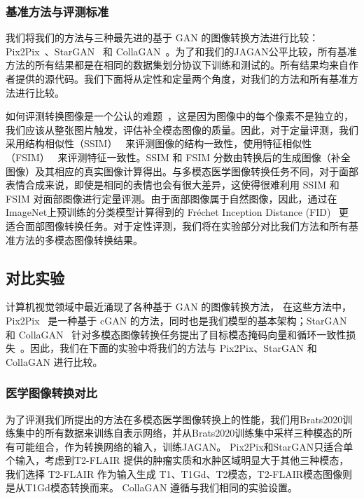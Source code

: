 \subsubsection{基准方法与评测标准}

我们将我们的方法与三种最先进的基于 GAN 的图像转换方法进行比较：Pix2Pix~\cite{pix2pix}、StarGAN~\cite{stargan} 和 CollaGAN~\cite{collagan}。为了和我们的JAGAN公平比较，所有基准方法的所有结果都是在相同的数据集划分协议下训练和测试的。所有结果均来自作者提供的源代码。我们下面将从定性和定量两个角度，对我们的方法和所有基准方法进行比较。

如何评测转换图像是一个公认的难题~\cite{salimans2016improved}，这是因为图像中的每个像素不是独立的，我们应该从整张图片触发，评估补全模态图像的质量。因此，对于定量评测，我们采用结构相似性（SSIM）~\cite{ssim} 来评测图像的结构一致性，使用特征相似性（FSIM）~\cite{fsim} 来评测特征一致性。SSIM 和 FSIM 分数由转换后的生成图像（补全图像）及其相应的真实图像计算得出。与多模态医学图像转换任务不同，对于面部表情合成来说，即使是相同的表情也会有很大差异，这使得很难利用 SSIM 和 FSIM 对面部图像进行定量评测。由于面部图像属于自然图像，因此，通过在ImageNet上预训练的分类模型计算得到的 Fréchet Inception Distance (FID)~\cite{fid} 更适合面部图像转换任务。对于定性评测，我们将在实验部分对比我们方法和所有基准方法的多模态图像转换结果。

\subsection{对比实验}

计算机视觉领域中最近涌现了各种基于 GAN 的图像转换方法， 在这些方法中，Pix2Pix~\cite{pix2pix} 是一种基于 cGAN 的方法，同时也是我们模型的基本架构；StarGAN~\cite{stargan} 和 CollaGAN~\cite{collagan} 针对多模态图像转换任务提出了目标模态掩码向量和循环一致性损失~\cite{cyclegan}。因此，我们在下面的实验中将我们的方法与 Pix2Pix、StarGAN 和 CollaGAN 进行比较。

\subsubsection{医学图像转换对比}
为了评测我们所提出的方法在多模态医学图像转换上的性能，我们用Brats2020训练集中的所有数据来训练自表示网络，并从Brats2020训练集中采样三种模态的所有可能组合，作为转换网络的输入，训练JAGAN。 Pix2Pix和StarGAN只适合单个输入，考虑到T2-FLAIR 提供的肿瘤实质和水肿区域明显大于其他三种模态，我们选择 T2-FLAIR 作为输入生成 T1、T1Gd、T2模态，T2-FLAIR模态图像则是从T1Gd模态转换而来。 CollaGAN 遵循与我们相同的实验设置。

